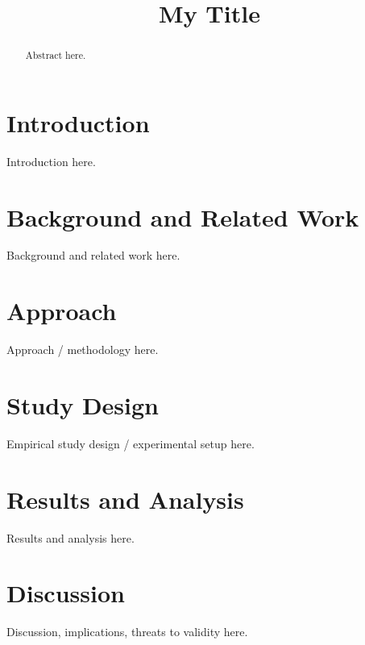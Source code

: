 \documentclass[manuscript,review,anonymous]{acmart}
\begin{document}
\title{My Title}

\begin{abstract}
Abstract here.
\end{abstract}


\maketitle

\section{Introduction}
\label{sec:intro}
Introduction here.

\section{Background and Related Work}
\label{sec:background}
Background and related work here.

\section{Approach}
\label{sec:approach}
Approach / methodology here.

\section{Study Design}
\label{sec:design}
Empirical study design / experimental setup here.

\section{Results and Analysis}
\label{sec:results}
Results and analysis here.

\section{Discussion}
\label{sec:discussion}
Discussion, implications, threats to validity here.
\end{document}
